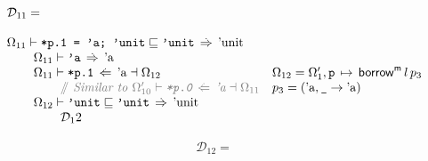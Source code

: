 \documentclass[12pt,twoside]{report}
\begin{document}
{  \[\begin{array}{ll}
    \mathcal{D}_{11} = \\\\

    \Omega_{11} \vdash \mono{*p.1 = 'a; 'unit} \subtype \mono{'unit} \movearrowabs \atom{unit} \\
    \otab\Omega_{11} \vdash \mono{'a} \movearrowabs \atom{a} \\
    \otab\Omega_{11} \vdash \mono{*p.1} \writearrowabs \atom{a} \dashv \Omega_{12} &
      \Omega_{12} = \Omega_1',\absmapm{p}{\borrowm{l}{p_3}} \\
    \otab\otab \ocomment{Similar to $\Omega_{10}' \vdash \mono{*p.0} \writearrowabs \atom{a} \dashv \Omega_{11}$} &
      p_3 = (\atom{a}, \mono{\_} \rightarrow \atom{a}) \\
    \otab\Omega_{12} \vdash \mono{'unit} \subtype \mono{'unit} \movearrowabs \atom{unit} \\
    \otab\otab \mathcal{D}_12 \\
  \end{array}\]
  
  \[\begin{array}{lll}
    \mathcal{D}_{12} = \\\\


\end{array}\]}
\end{document}
